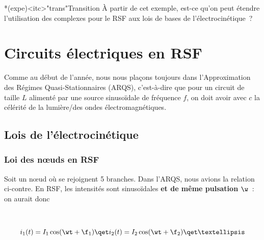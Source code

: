 \documentclass[../../main/main.tex]{subfiles}
\begin{document}
\begin{tcb}*(expe)<itc>"trans"{Transition}
	À partir de cet exemple, est-ce qu'on peut étendre l'utilisation des
	complexes pour le RSF aux lois de bases de l'électrocinétique~?
\end{tcb}

\section{Circuits électriques en RSF}
Comme au début de l'année, nous nous plaçons toujours dans l'Approximation des
Régimes Quasi-Stationnaires (ARQS), c'est-à-dire que pour un circuit de taille
$L$ alimenté par une source sinusoïdale de fréquence $f$, on doit avoir
 avec $c$ la célérité de la lumière/des ondes
électromagnétiques.

\subsection{Lois de l'électrocinétique}
\subsubsection{Loi des nœuds en RSF}
\noindent
\begin{minipage}[t]{.48\linewidth}
	Soit un nœud où se rejoignent 5 branches. Dans l'ARQS, nous avions
	la relation ci-contre. En RSF, les intensités sont sinusoïdales \textbf{et
		de même pulsation} $\w$~: on aurait donc
\end{minipage}
\hfill
\begin{minipage}[t]{.48\linewidth}
	~
	\vspace{-50pt}
	\begin{center}
	\end{center}
\end{minipage}
\[
	i_1(t) = I_1\cos(\wt+\f_1)
	\qet
	i_2(t) = I_2\cos(\wt+\f_2)
	\qet
	…
\]
\end{document}
